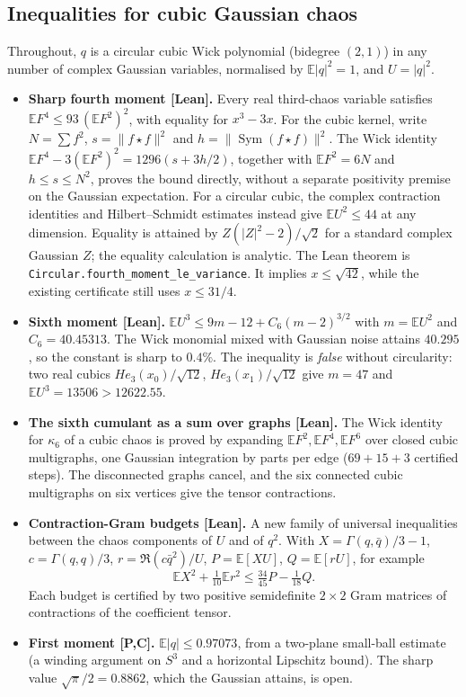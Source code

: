 \documentclass[11pt,a4paper]{article}
\newcommand{\E}{\mathbb{E}}
\newcommand{\lean}[1]{\texttt{\small #1}}
\begin{document}
\subsection{Inequalities for cubic Gaussian chaos}
Throughout, $q$ is a circular cubic Wick polynomial (bidegree $(2,1)$) in any number of complex Gaussian variables,
normalised by $\E|q|^2=1$, and $U=|q|^2$.
\begin{itemize}
\item \textbf{Sharp fourth moment [Lean].} Every real third-chaos variable satisfies $\E F^4\le93\,(\E F^2)^2$, with equality
 for $x^3-3x$. For the cubic kernel, write $N=\sum f^2$, $s=\|f\star f\|^2$ and
 $h=\|\operatorname{Sym}(f\star f)\|^2$. The Wick identity
 $\E F^4-3(\E F^2)^2=1296(s+3h/2)$, together with $\E F^2=6N$ and
 $h\le s\le N^2$, proves the bound directly, without a separate positivity premise
 on the Gaussian expectation. For a circular cubic, the complex contraction identities and Hilbert--Schmidt
 estimates instead give $\E U^2\le44$ at any dimension. Equality is attained by
 $Z(|Z|^2-2)/\sqrt2$ for a standard complex Gaussian $Z$; the equality calculation
 is analytic. The Lean theorem is \lean{Circular.fourth\_moment\_le\_variance}.
 It implies $x\le\sqrt{42}$, while the existing certificate still uses $x\le31/4$.
\item \textbf{Sixth moment [Lean].} $\E U^3\le9m-12+C_6(m-2)^{3/2}$ with $m=\E U^2$ and $C_6=40.45313$. The Wick monomial mixed
 with Gaussian noise attains $40.295$, so the constant is sharp to $0.4\%$. The inequality is \emph{false} without circularity:
 two real cubics $He_3(x_0)/\sqrt{12}$, $He_3(x_1)/\sqrt{12}$ give $m=47$ and $\E U^3=13506>12622.55$.
\item \textbf{The sixth cumulant as a sum over graphs [Lean].} The Wick identity for $\kappa_6$ of a cubic chaos is proved by
 expanding $\E F^2,\E F^4,\E F^6$ over closed cubic multigraphs, one Gaussian integration by parts per edge ($69+15+3$
 certified steps). The disconnected graphs cancel, and the six connected cubic multigraphs on six vertices give the tensor
 contractions.
\item \textbf{Contraction-Gram budgets [Lean].} A new family of universal inequalities between the chaos components of $U$
 and of $q^2$. With $X=\Gamma(q,\bar q)/3-1$, $c=\Gamma(q,q)/3$, $r=\Re(c\bar q^2)/U$, $P=\E[XU]$, $Q=\E[rU]$, for example
 \[
  \E X^2+\tfrac1{10}\E r^2\le\tfrac{34}{45}P-\tfrac1{18}Q .
 \]
 Each budget is certified by two positive semidefinite $2\times2$ Gram matrices of contractions of the coefficient tensor.
\item \textbf{First moment [P,C].} $\E|q|\le0.97073$, from a two-plane small-ball estimate (a winding argument on $S^3$ and a
 horizontal Lipschitz bound). The sharp value $\sqrt\pi/2=0.8862$, which the Gaussian attains, is open.
\end{itemize}
\end{document}
